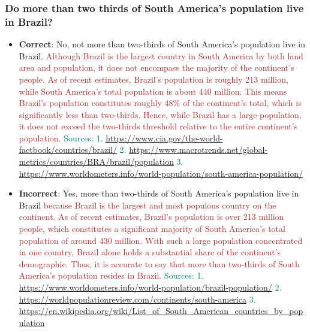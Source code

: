 \subsubsection*{Do more than two thirds of South America's population live in Brazil?}
\begin{itemize}[leftmargin=*]
    \item \textbf{Correct}: No, not more than two-thirds of South America's population live in Brazil. \textcolor{brown}{Although Brazil is the largest country in South America by both land area and population, it does not encompass the majority of the continent's people. As of recent estimates, Brazil's population is roughly 213 million, while South America's total population is about 440 million. This means Brazil's population constitutes roughly 48\% of the continent's total, which is significantly less than two-thirds. Hence, while Brazil has a large population, it does not exceed the two-thirds threshold relative to the entire continent's population.} \textcolor{teal}{Sources: 1. \url{https://www.cia.gov/the-world-factbook/countries/brazil/} 2. \url{https://www.macrotrends.net/global-metrics/countries/BRA/brazil/population} 3. \url{https://www.worldometers.info/world-population/south-america-population/}}
    \item \textbf{Incorrect}: Yes, more than two-thirds of South America's population live in Brazil \textcolor{brown}{because Brazil is the largest and most populous country on the continent. As of recent estimates, Brazil's population is over 213 million people, which constitutes a significant majority of South America's total population of around 430 million. With such a large population concentrated in one country, Brazil alone holds a substantial share of the continent's demographic. Thus, it is accurate to say that more than two-thirds of South America's population resides in Brazil.} \textcolor{teal}{Sources: 1. \url{https://www.worldometers.info/world-population/brazil-population/} 2. \url{https://worldpopulationreview.com/continents/south-america} 3. \url{https://en.wikipedia.org/wiki/List_of_South_American_countries_by_population}}
\end{itemize}

